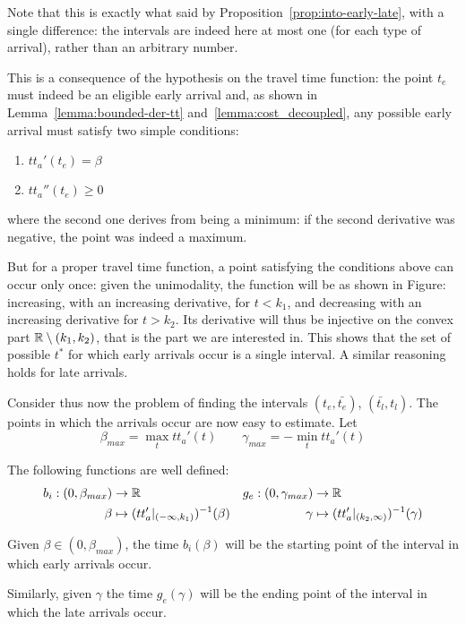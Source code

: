 Note that this is exactly what said by Proposition~\ref{prop:into-early-late},
with a single difference:
the intervals are indeed here at most one (for each type of arrival), rather than an arbitrary number.

This is a consequence of the hypothesis on the travel time function:
the point \(t_e\) must indeed be an eligible early arrival and,
as shown in Lemma~\ref{lemma:bounded-der-tt} and~\ref{lemma:cost_decoupled},
any possible early arrival must satisfy two simple conditions:
\begin{enumerate}
\item \(tt_a'(t_e) = \beta\)
\item \(tt_a''(t_e) \geq 0\)
\end{enumerate}
where the second one derives from being a minimum:
if the second derivative was negative, the point was indeed a maximum.

But for a proper travel time function,
a point satisfying the conditions above can occur only once:
given the unimodality,
the function will be as shown in Figure: increasing, with an increasing derivative,
for \(t < k_1\), and decreasing with an increasing derivative for \(t > k_2\).
Its derivative will thus be injective on the convex part \(\mathbb{R} \setminus (k_1, k_2)\),
that is the part we are interested in.
This shows that the set of possible \(t^*\) for which early arrivals occur is a single interval.
A similar reasoning holds for late arrivals.

Consider thus now the problem of finding the intervals \((t_e, \bar{t_e})\), \((\bar{t_l}, t_l)\).
The points in which the arrivals occur are now easy to estimate. Let
\begin{equation*}
  \beta_{max} = \max_t tt_a'(t)\qquad \gamma_{max} = -\min_t tt_a'(t)
\end{equation*}

The following functions are well defined:
\begin{align*}
  b_i: (0, \beta_{max}) & \rightarrow \mathbb{R}  & g_e: (0, \gamma_{max}) & \rightarrow \mathbb{R} \\
       \beta & \mapsto (tt_a' |_{(-\infty, k_1)})^{-1}(\beta) & \gamma & \mapsto(tt_a' |_{(k_2, \infty)})^{-1}(\gamma)
\end{align*}

Given \(\beta \in (0, \beta_{max})\),
the time \(b_i(\beta)\) will be the starting point of the interval in which early arrivals occur.

Similarly, given \(\gamma\) the time \(g_e(\gamma)\) will be the ending point of the interval in which the late arrivals occur.


